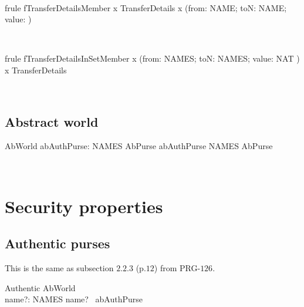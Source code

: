 \begin{LFRT}
~\end{LFRT}

\begin{LFRT}
\begin{theorem}{frule fTransferDetailsMember}
    x \in  TransferDetails \implies  x \in  (\lblot from: NAME; toN: NAME; value: \nat \rblot)
\end{theorem}~\end{LFRT}

\begin{LFRT}
\begin{theorem}{frule fTransferDetailsInSetMember}
    x \in  (\lblot from: NAMES; toN: NAMES; value: NAT \rblot) \implies  x \in  TransferDetails
\end{theorem}~\end{LFRT}

\subsection{Abstract world}

\begin{LSDef}
\begin{schema}{AbWorld}
  abAuthPurse: NAMES \pfun  AbPurse
\where
  abAuthPurse \in  NAMES \ffun  AbPurse
\end{schema}~\end{LSDef}

\section{Security properties}\label{ch3.security}

\subsection{Authentic purses}

This is the same as subsection $2.2.3$ (p.$12$) from PRG-$126$.
\begin{LSDef}
\begin{schema}{Authentic}
  AbWorld\\
  name?: NAMES
\where
  name? \in \dom~abAuthPurse
\end{schema}~\end{LSDef}


